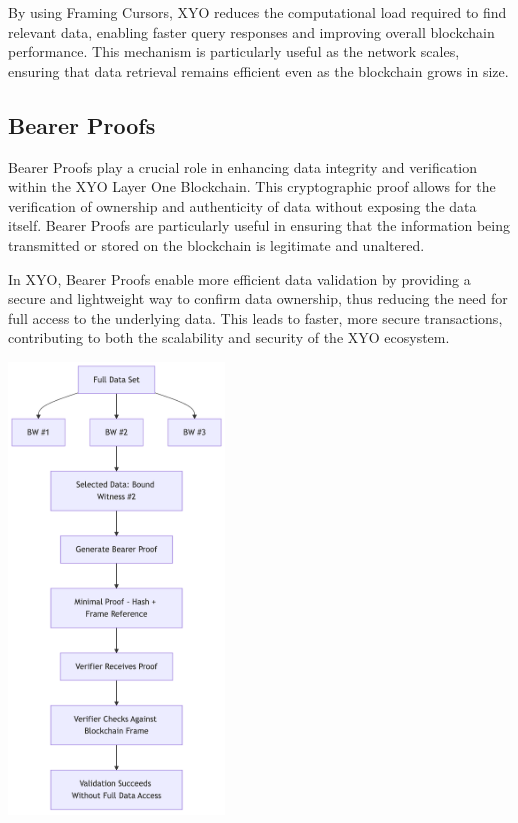 \documentclass{article}
\begin{document}
By using Framing Cursors, XYO reduces the computational load required to find
relevant data, enabling faster query responses and improving overall blockchain
performance. This mechanism is particularly useful as the network scales,
ensuring that data retrieval remains efficient even as the blockchain grows in
size.

\subsection{Bearer Proofs}
\begin{minipage}[t]{0.45\textwidth}
    \raggedright
    Bearer Proofs play a crucial role in enhancing data integrity and verification within the XYO Layer One Blockchain. This cryptographic proof allows for the verification of ownership and authenticity of data without exposing the data itself. Bearer Proofs are particularly useful in ensuring that the information being transmitted or stored on the blockchain is legitimate and unaltered.

    In XYO, Bearer Proofs enable more efficient data validation by providing a
    secure and lightweight way to confirm data ownership, thus reducing the need
    for full access to the underlying data. This leads to faster, more secure
    transactions, contributing to both the scalability and security of the XYO
    ecosystem.

\end{minipage}%
\hfill
\begin{minipage}[t]{0.42\textwidth}
    \centering
    \vspace*{-2.5em} %
    \includegraphics[height=12cm]{bearer-proof.png}
    \vspace{0.5em} %
\end{minipage}
\end{document}

